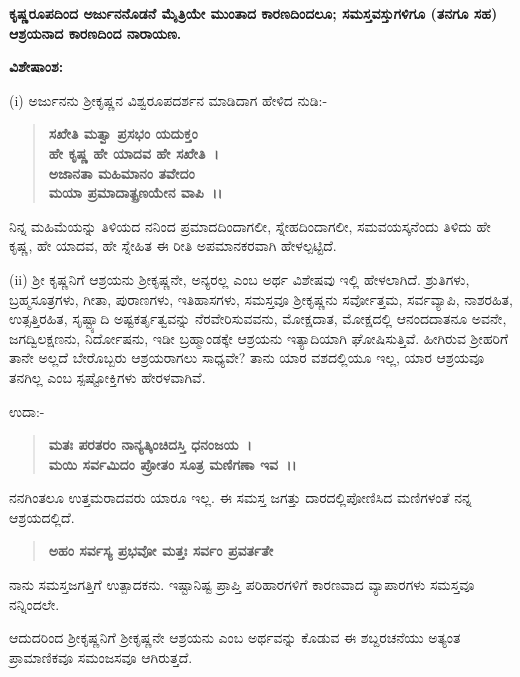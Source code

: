\begin{center}
\textbf{ಕೃಷ್ಣರೂಪದಿಂದ ಅರ್ಜುನನೊಡನೆ ಮೈತ್ರಿಯೇ ಮುಂತಾದ ಕಾರಣದಿಂದಲೂ; ಸಮಸ್ತವಸ್ತುಗಳಿಗೂ (ತನಗೂ ಸಹ) ಆಶ್ರಯನಾದ ಕಾರಣದಿಂದ ನಾರಾಯಣ.}
\end{center}

\noindent
\textbf{ವಿಶೇಷಾಂಶ:\enginline{-}}

(i) ಅರ್ಜುನನು ಶ‍್ರೀಕೃಷ್ಣನ ವಿಶ್ವರೂಪದರ್ಶನ ಮಾಡಿದಾಗ ಹೇಳಿದ ನುಡಿ:-

\begin{verse}
\textbf{ಸಖೇತಿ ಮತ್ವಾ ಪ್ರಸಭಂ ಯದುಕ್ತಂ}\\\textbf{ಹೇ ಕೃಷ್ಣ ಹೇ ಯಾದವ ಹೇ ಸಖೇತಿ~।}\\\textbf{ಅಜಾನತಾ ಮಹಿಮಾನಂ ತವೇದಂ}\\\textbf{ಮಯಾ ಪ್ರಮಾದಾತ್ಪ್ರಣಯೇನ ವಾಪಿ~।।}
\end{verse}


ನಿನ್ನ ಮಹಿಮೆಯನ್ನು ತಿಳಿಯದ ನನಿಂದ ಪ್ರಮಾದದಿಂದಾಗಲೀ, ಸ್ನೇಹದಿಂದಾಗಲೀ, ಸಮವಯಸ್ಕನೆಂದು ತಿಳಿದು ಹೇ ಕೃಷ್ಣ, ಹೇ ಯಾದವ, ಹೇ ಸ್ನೇಹಿತ ಈ ರೀತಿ ಅಪಮಾನಕರವಾಗಿ ಹೇಳಲ್ಪಟ್ಟಿದೆ.

(ii) ಶ‍್ರೀ ಕೃಷ್ಣನಿಗೆ ಆಶ್ರಯನು ಶ‍್ರೀಕೃಷ್ಣನೇ, ಅನ್ಯರಲ್ಲ ಎಂಬ ಅರ್ಥ ವಿಶೇಷವು ಇಲ್ಲಿ ಹೇಳಲಾಗಿದೆ. ಶ್ರುತಿಗಳು, ಬ್ರಹ್ಮಸೂತ್ರಗಳು, ಗೀತಾ, ಪುರಾಣಗಳು, ಇತಿಹಾಸಗಳು, ಸಮಸ್ತವೂ ಶ‍್ರೀಕೃಷ್ಣನು ಸರ್ವೋತ್ತಮ, ಸರ್ವವ್ಯಾಪಿ, ನಾಶರಹಿತ, ಉತ್ಸತ್ತಿರಹಿತ, ಸೃಷ್ಟ್ಯಾದಿ ಅಷ್ಟಕರ್ತೃತ್ವವನ್ನು ನೆರವೇರಿಸುವವನು, ಮೋಕ್ಷದಾತ, ಮೋಕ್ಷದಲ್ಲಿ ಆನಂದದಾತನೂ ಅವನೇ, ಜಗದ್ವಿಲಕ್ಷಣನು, ನಿರ್ದೋಷನು, ಇಡೀ ಬ್ರಹ್ಮಾಂಡಕ್ಕೇ ಆಶ್ರಯನು ಇತ್ಯಾದಿಯಾಗಿ ಘೋಷಿಸುತ್ತಿವೆ. ಹೀಗಿರುವ ಶ‍್ರೀಹರಿಗೆ ತಾನೇ ಅಲ್ಲದೆ ಬೇರೊಬ್ಬರು ಆಶ್ರಯರಾಗಲು ಸಾಧ್ಯವೇ? ತಾನು ಯಾರ ವಶದಲ್ಲಿಯೂ ಇಲ್ಲ, ಯಾರ ಆಶ್ರಯವೂ ತನಗಿಲ್ಲ ಎಂಬ ಸ್ಪಷ್ಟೋಕ್ತಿಗಳು ಹೇರಳವಾಗಿವೆ.

ಉದಾ:-

\begin{verse}
\textbf{ಮತಃ ಪರತರಂ ನಾನ್ಯತ್ಕಿಂಚಿದಸ್ತಿ ಧನಂಜಯ~।}\\\textbf{ಮಯಿ ಸರ್ವಮಿದಂ ಪ್ರೋತಂ ಸೂತ್ರ ಮಣಿಗಣಾ ಇವ~।।}
\end{verse}


ನನಗಿಂತಲೂ ಉತ್ತಮರಾದವರು ಯಾರೂ ಇಲ್ಲ. ಈ ಸಮಸ್ತ ಜಗತ್ತು ದಾರದಲ್ಲಿ\break ಪೋಣಿಸಿದ ಮಣಿಗಳಂತೆ ನನ್ನ ಆಶ್ರಯದಲ್ಲಿದೆ.

\begin{verse}
\textbf{ಅಹಂ ಸರ್ವಸ್ಯ ಪ್ರಭವೋ ಮತ್ತಃ ಸರ್ವಂ ಪ್ರವರ್ತತೇ}
\end{verse}


ನಾನು ಸಮಸ್ತಜಗತ್ತಿಗೆ ಉತ್ಪಾದಕನು. ಇಷ್ಟಾನಿಷ್ಟ ಪ್ರಾಪ್ತಿ ಪರಿಹಾರಗಳಿಗೆ ಕಾರಣವಾದ ವ್ಯಾಪಾರಗಳು ಸಮಸ್ತವೂ ನನ್ನಿಂದಲೇ.

ಆದುದರಿಂದ ಶ‍್ರೀಕೃಷ್ಣನಿಗೆ ಶ‍್ರೀಕೃಷ್ಣನೇ ಆಶ್ರಯನು ಎಂಬ ಅರ್ಥವನ್ನು ಕೊಡುವ ಈ ಶಬ್ದರಚನೆಯು ಅತ್ಯಂತ ಪ್ರಾಮಾಣಿಕವೂ ಸಮಂಜಸವೂ ಆಗಿರುತ್ತದೆ.

